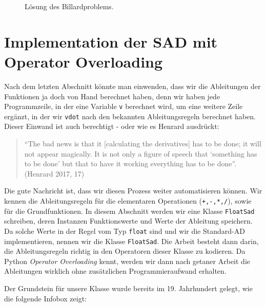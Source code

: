 \documentclass[
  letterpaper,
  DIV=11,
  oneside]{scrreprt}
\theoremstyle{definition}
\theoremstyle{definition}
\theoremstyle{remark}
\begin{document}
\begin{tcolorbox}
\begin{figure}[H]
{}

\caption{\label{fig-billardproblemsolution}Lösung des Billardproblems.}

\end{figure}

\end{tcolorbox}

\hypertarget{sec-SadImplementationOperatorOverloading}{%
\section{Implementation der SAD mit Operator
Overloading}\label{sec-SadImplementationOperatorOverloading}}

Nach dem letzten Abschnitt könnte man einwenden, dass wir die
Ableitungen der Funktionen ja doch von Hand berechnet haben, denn wir
haben jede Programmzeile, in der eine Variable \texttt{v} berechnet
wird, um eine weitere Zeile ergänzt, in der wir \texttt{vdot} nach den
bekannten Ableitungsregeln berechnet haben. Dieser Einwand ist auch
berechtigt - oder wie es Henrard ausdrückt:

\begin{quote}
``The bad news is that it {[}calculating the derivatives{]} has to be
done; it will not appear magically. It is not only a figure of speech
that `something has to be done' but that to have it working everything
has to be done''. (Henrard 2017, 17)
\end{quote}

Die gute Nachricht ist, dass wir diesen Prozess weiter automatisieren
können. Wir kennen die Ableitungsregeln für die elementaren Operationen
(\texttt{+,-,*,/}), sowie für die Grundfunktionen. In diesem Abschnitt
werden wir eine Klasse \texttt{FloatSad} schreiben, deren Instanzen
Funktionswerte und Werte der Ableitung speichern. Da solche Werte in der
Regel vom Typ \texttt{float} sind und wir die Standard-AD
implementieren, nennen wir die Klasse \texttt{FloatSad}. Die Arbeit
besteht dann darin, die Ableitungsregeln richtig in den Operatoren
dieser Klasse zu kodieren. Da Python \emph{Operator Overloading} kennt,
werden wir dann nach getaner Arbeit die Ableitungen wirklich ohne
zusätzlichen Programmieraufwand erhalten.

Der Grundstein für unsere Klasse wurde bereits im 19. Jahrhundert
gelegt, wie die folgende Infobox zeigt:
\end{document}
